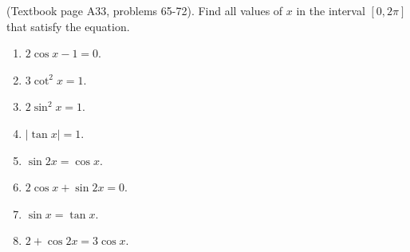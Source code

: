 \begin{problem}(Textbook page A33, problems 65-72).
Find all values of $x$ in the interval $[0,2\pi]$ that satisfy the 
equation.
\begin{multicols}{3}
\begin{enumerate}
\item $2\cos x - 1=0$.
\item $3\cot^2 x= 1$.
\item $2\sin^2 x= 1$.
\item $|\tan x|=1 $.
\item $\sin 2x = \cos x $.
\item $2\cos x +\sin 2x=0$.
\item $\sin x =\tan x$.
\item $2+\cos 2x = 3 \cos x$.
\end{enumerate}
\end{multicols}
\end{problem}
